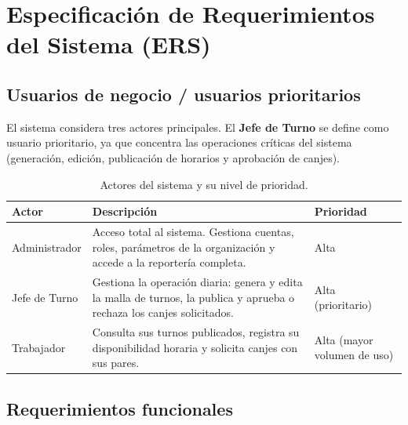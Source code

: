 \documentclass[12pt,letterpaper]{article}
\newcommand{\hd}[1]{\textbf{#1}}
\newcommand{\filaenc}{\rowcolor{verdesuave}}
\begin{document}
\clearpage
\section{Especificación de Requerimientos del Sistema (ERS)}

\subsection{Usuarios de negocio / usuarios prioritarios}

El sistema considera tres actores principales. El \textbf{Jefe de Turno} se define como usuario prioritario, ya que concentra las operaciones críticas del sistema (generación, edición, publicación de horarios y aprobación de canjes).

\begin{table}[H]
\centering
\caption{Actores del sistema y su nivel de prioridad.}
\label{tab:actores}
\small
\begin{tabularx}{\textwidth}{L{3.1cm}YL{2.4cm}}
\toprule
\filaenc \hd{Actor} & \hd{Descripción} & \hd{Prioridad} \\
\midrule
Administrador & Acceso total al sistema. Gestiona cuentas, roles, parámetros de la organización y accede a la reportería completa. & Alta \\
Jefe de Turno & Gestiona la operación diaria: genera y edita la malla de turnos, la publica y aprueba o rechaza los canjes solicitados. & Alta (prioritario) \\
Trabajador & Consulta sus turnos publicados, registra su disponibilidad horaria y solicita canjes con sus pares. & Alta (mayor volumen de uso) \\
\bottomrule
\end{tabularx}
\end{table}

\subsection{Requerimientos funcionales}
\end{document}

